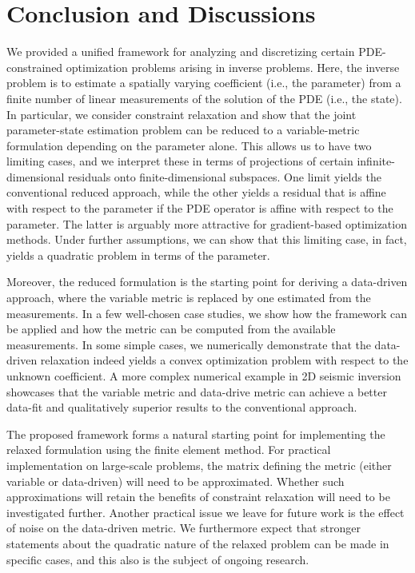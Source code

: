 \documentclass[12pt]{amsart}
\begin{document}
\section{Conclusion and Discussions}\label{conclusions}
We provided a unified framework for analyzing and discretizing certain PDE-constrained optimization problems arising in inverse problems. Here, the inverse problem is to estimate a spatially varying coefficient (i.e., the parameter) from a finite number of linear measurements of the solution of the PDE (i.e., the state). In particular, we consider constraint relaxation and show that the joint parameter-state estimation problem can be reduced to a variable-metric formulation depending on the parameter alone. This allows us to have two limiting cases, and we interpret these in terms of projections of certain infinite-dimensional residuals onto finite-dimensional subspaces. One limit yields the conventional reduced approach, while the other yields a residual that is affine with respect to the parameter if the PDE operator is affine with respect to the parameter. The latter is arguably more attractive for gradient-based optimization methods. Under further assumptions, we can show that this limiting case, in fact, yields a quadratic problem in terms of the parameter. 

Moreover, the reduced formulation  is the starting point for deriving a data-driven approach, where the variable metric is replaced by one estimated from the measurements. In a few well-chosen case studies, we show how the framework can be applied and how the metric can be computed from the available measurements. In some simple cases, we numerically demonstrate that the data-driven relaxation indeed yields a convex optimization problem with respect to the unknown coefficient. A more complex numerical example in 2D seismic inversion showcases that the variable metric and data-drive metric can achieve a better data-fit and qualitatively superior results to the conventional approach.

The proposed framework forms a natural starting point for implementing the relaxed formulation using the finite element method. For practical implementation on large-scale problems, the matrix defining the metric (either variable or data-driven) will need to be approximated. Whether such approximations will retain the benefits of constraint relaxation will need to be investigated further. Another practical issue we leave for future work is the effect of noise on the data-driven metric. We furthermore expect that stronger statements about the quadratic nature of the relaxed problem can be made in specific cases, and this also is the subject of ongoing research.
\end{document}
